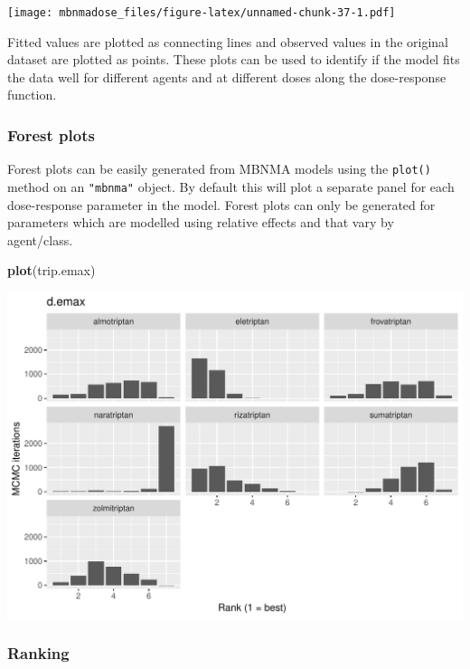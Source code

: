 \documentclass[]{article}
\newenvironment{Shaded}{\begin{snugshade}}{\end{snugshade}}
\newcommand{\KeywordTok}[1]{\textcolor[rgb]{0.13,0.29,0.53}{\textbf{#1}}}
\newcommand{\NormalTok}[1]{#1}
\begin{document}
\texttt{[image: mbnmadose\_files/figure-latex/unnamed-chunk-37-1.pdf]}

Fitted values are plotted as connecting lines and observed values in the
original dataset are plotted as points. These plots can be used to
identify if the model fits the data well for different agents and at
different doses along the dose-response function.

\hypertarget{forest-plots}{%
\subsubsection{Forest plots}\label{forest-plots}}

Forest plots can be easily generated from MBNMA models using the
\texttt{plot()} method on an \texttt{"mbnma"} object. By default this
will plot a separate panel for each dose-response parameter in the
model. Forest plots can only be generated for parameters which are
modelled using relative effects and that vary by agent/class.

\begin{Shaded}
\begin{Highlighting}[]
\KeywordTok{plot}\NormalTok{(trip.emax)}
\end{Highlighting}
\end{Shaded}

\includegraphics{mbnmadose_files/figure-latex/unnamed-chunk-38-1.pdf}

\hypertarget{ranking}{%
\subsubsection{Ranking}\label{ranking}}
\end{document}

